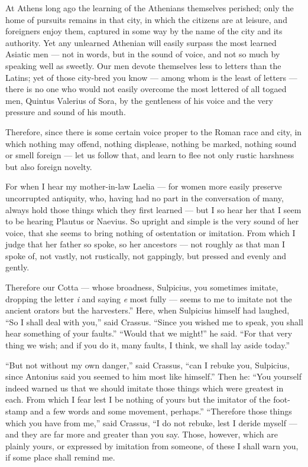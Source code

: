  At Athens long ago the learning of the Athenians themselves perished; only the home of pursuits remains in that city, in which the citizens are at leisure, and foreigners enjoy them, captured in some way by the name of the city and its authority. Yet any unlearned Athenian will easily surpass the most learned Asiatic men — not in words, but in the sound of voice, and not so much by speaking well as sweetly. Our men devote themselves less to letters than the Latins; yet of those city-bred you know — among whom is the least of letters — there is no one who would not easily overcome the most lettered of all togaed men, Quintus Valerius of Sora, by the gentleness of his voice and the very pressure and sound of his mouth.

 Therefore, since there is some certain voice proper to the Roman race and city, in which nothing may offend, nothing displease, nothing be marked, nothing sound or smell foreign — let us follow that, and learn to flee not only rustic harshness but also foreign novelty.

 For when I hear my mother-in-law Laelia — for women more easily preserve uncorrupted antiquity, who, having had no part in the conversation of many, always hold those things which they first learned — but I so hear her that I seem to be hearing Plautus or Naevius. So upright and simple is the very sound of her voice, that she seems to bring nothing of ostentation or imitation. From which I judge that her father so spoke, so her ancestors — not roughly as that man I spoke of, not vastly, not rustically, not gappingly, but pressed and evenly and gently.

 Therefore our Cotta — whose broadness, Sulpicius, you sometimes imitate, dropping the letter \textit{i} and saying \textit{e} most fully — seems to me to imitate not the ancient orators but the harvesters.'' Here, when Sulpicius himself had laughed, ``So I shall deal with you,'' said Crassus. ``Since you wished me to speak, you shall hear something of your faults.'' ``Would that we might!'' he said. ``For that very thing we wish; and if you do it, many faults, I think, we shall lay aside today.''

 ``But not without my own danger,'' said Crassus, ``can I rebuke you, Sulpicius, since Antonius said you seemed to him most like himself.'' Then he: ``You yourself indeed warned us that we should imitate those things which were greatest in each. From which I fear lest I be nothing of yours but the imitator of the foot-stamp and a few words and some movement, perhaps.'' ``Therefore those things which you have from me,'' said Crassus, ``I do not rebuke, lest I deride myself — and they are far more and greater than you say. Those, however, which are plainly yours, or expressed by imitation from someone, of these I shall warn you, if some place shall remind me.

